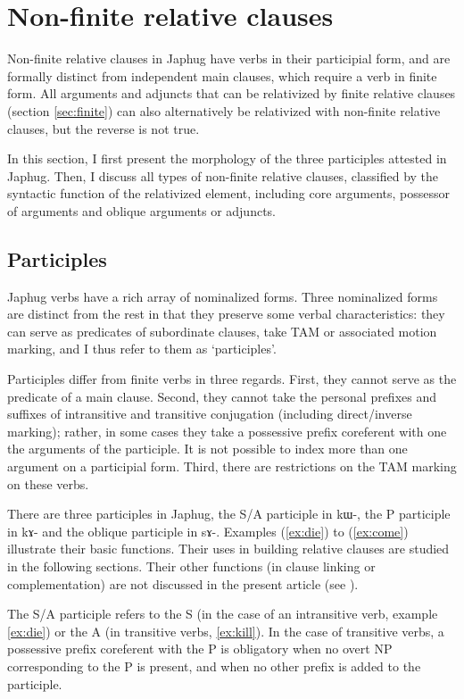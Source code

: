 \documentclass[oldfontcommands,oneside,a4paper,11pt]{article}
\newcommand{\ipa}[1]{{\phon #1}} %
\newcommand{\refb}[1]{(\ref{#1})}
\begin{document}
\section{Non-finite relative clauses} \label{sec:nonfinite}
Non-finite relative clauses in Japhug have verbs in their participial form, and are formally distinct from independent main clauses, which require a verb in finite form. All arguments and adjuncts that can be relativized by finite relative clauses (section \ref{sec:finite}) can also alternatively be relativized with non-finite relative clauses, but the reverse is not true.

In this section, I first present the morphology of the three participles attested in Japhug. Then, I discuss all types of non-finite relative clauses, classified by the syntactic function of the relativized element, including core arguments, possessor of arguments and oblique arguments or adjuncts.



\subsection{Participles}
Japhug verbs have a rich array of nominalized forms. Three nominalized forms are distinct from the rest in that they preserve some verbal characteristics: they can serve as predicates of subordinate clauses, take TAM or associated motion marking, and I thus refer to them as `participles'. 

Participles differ from finite verbs in three regards. First, they cannot serve as the predicate of a main clause. Second, they cannot take the personal prefixes and suffixes of intransitive and transitive conjugation (including direct/inverse marking); rather, in some cases they take a possessive prefix coreferent with one the arguments of the participle. It is not possible to index more than one argument on a participial form. Third, there are restrictions on the TAM marking on these verbs.

There are three participles in Japhug, the S/A participle in \ipa{kɯ-}, the P participle in \ipa{kɤ-} and the oblique participle in \ipa{sɤ-}. Examples \refb{ex:die} to \refb{ex:come} illustrate their basic functions. Their uses in building relative clauses are studied in the following sections. Their other functions (in clause linking or complementation) are not discussed in the present article (see \citealt{jacques14linking}).

The S/A participle refers to the S (in the case of an intransitive verb, example \ref{ex:die}) or the A (in transitive verbs, \ref{ex:kill}). In the case of transitive verbs, a possessive prefix coreferent with the P is obligatory when no overt NP corresponding to the P is present, and when no other prefix is added to the participle.
\end{document}
